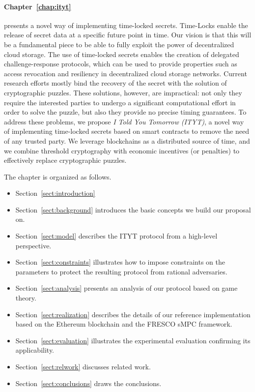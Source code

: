 \paragraph*{Chapter~\ref{chap:ityt}} presents a novel way of implementing time-locked secrets. Time-Locks enable the release of secret data at a specific future point in time. Our vision is that this will be a fundamental piece to be able to fully exploit the power of decentralized cloud storage. The use of time-locked secrets enables the creation of delegated challenge-response protocols, which can be used to provide properties such as access revocation and resiliency in decentralized cloud storage networks.
%
Current research efforts mostly bind the recovery of the secret with the solution of cryptographic puzzles. These solutions, however, are  impractical: not only they require the interested parties to undergo a significant computational effort in order to solve the puzzle, but also they provide no precise timing guarantees.
%
To address these problems, we propose {\em I {\em Told} You Tomorrow (ITYT)}, a novel way of implementing time-locked secrets based on smart contracts to remove the need of any trusted party. We leverage blockchains as a distributed source of time, and we combine threshold cryptography with economic incentives (or penalties) to effectively replace cryptographic puzzles.

\smallskip

The chapter is organized as follows.

\begin{itemize}
	
\item Section~\ref{sect:introduction}
	
\item Section~\ref{sect:background} introduces the basic concepts we build our proposal on. 

\item Section~\ref{sect:model} describes the ITYT protocol from a high-level perspective.

\item Section~\ref{sect:constraints} illustrates how to impose constraints on the parameters to protect the resulting protocol from rational adversaries.

\item Section~\ref{sect:analysis} presents an analysis of our protocol based on game theory.

\item Section~\ref{sect:realization} describes the details of our reference implementation based on the Ethereum blockchain and the FRESCO sMPC framework.

\item Section~\ref{sect:evaluation} illustrates the experimental evaluation confirming its applicability.

\item Section~\ref{sect:relwork} discusses related work.

\item Section~\ref{sect:conclusions} draws the conclusions.
\end{itemize}

